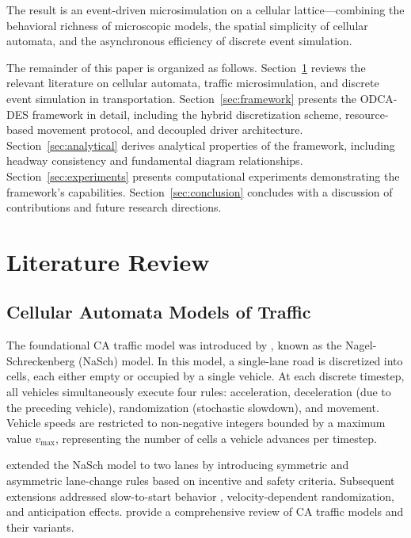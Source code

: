 \documentclass[review,authoryear]{elsarticle}
\begin{document}
The result is an event-driven microsimulation on a cellular lattice---combining the behavioral richness of microscopic models, the spatial simplicity of cellular automata, and the asynchronous efficiency of discrete event simulation.

The remainder of this paper is organized as follows. Section~\ref{sec:literature} reviews the relevant literature on cellular automata, traffic microsimulation, and discrete event simulation in transportation. Section~\ref{sec:framework} presents the ODCA-DES framework in detail, including the hybrid discretization scheme, resource-based movement protocol, and decoupled driver architecture. Section~\ref{sec:analytical} derives analytical properties of the framework, including headway consistency and fundamental diagram relationships. Section~\ref{sec:experiments} presents computational experiments demonstrating the framework's capabilities. Section~\ref{sec:conclusion} concludes with a discussion of contributions and future research directions.


\section{Literature Review}
\label{sec:literature}

\subsection{Cellular Automata Models of Traffic}
\label{sec:lit_ca}

The foundational CA traffic model was introduced by \citet{nagel1992cellular}, known as the Nagel-Schreckenberg (NaSch) model. In this model, a single-lane road is discretized into cells, each either empty or occupied by a single vehicle. At each discrete timestep, all vehicles simultaneously execute four rules: acceleration, deceleration (due to the preceding vehicle), randomization (stochastic slowdown), and movement. Vehicle speeds are restricted to non-negative integers bounded by a maximum value $v_{\max}$, representing the number of cells a vehicle advances per timestep.

\citet{rickert1996two} extended the NaSch model to two lanes by introducing symmetric and asymmetric lane-change rules based on incentive and safety criteria. Subsequent extensions addressed slow-to-start behavior \citep{knospe2004towards}, velocity-dependent randomization, and anticipation effects. \citet{maerivoet2005cellular} provide a comprehensive review of CA traffic models and their variants.
\end{document}

